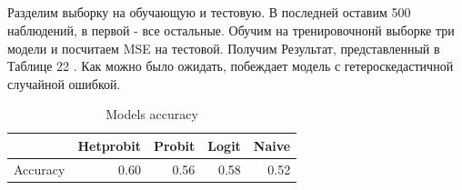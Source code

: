 \documentclass[a4paper,12pt]{article}
\begin{document}
\subsection{}

\subsection{}
Разделим выборку на обучающую и тестовую. В последней оставим 500 наблюдений, в первой - все остальные. Обучим на тренировочнонй выборке три модели и посчитаем MSE на тестовой. Получим Результат, представленный в Таблице 22 . Как можно было ожидать, побеждает модель с гетероскедастичной случайной ошибкой. 

\begin{table}[ht]
	\centering
	\begin{tabular}{|rrrrr|}
		\hline
		& Hetprobit & Probit & Logit & Naive \\ 
		\hline
		Accuracy & 0.60 & 0.56 & 0.58 & 0.52 \\ 
		\hline
	\end{tabular}
\caption{Models accuracy}
\end{table}
\end{document}
